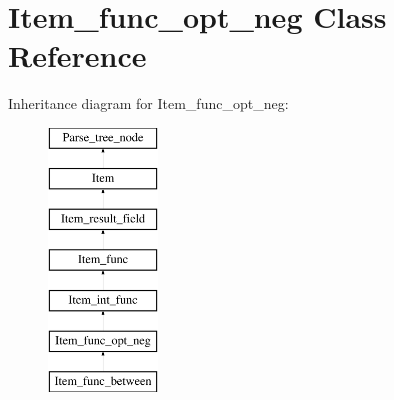 \hypertarget{classItem__func__opt__neg}{}\section{Item\+\_\+func\+\_\+opt\+\_\+neg Class Reference}
\label{classItem__func__opt__neg}
Inheritance diagram for Item\+\_\+func\+\_\+opt\+\_\+neg\+:\begin{figure}[H]
\begin{center}
\leavevmode
\includegraphics[height=7.000000cm]{classItem__func__opt__neg}
\end{center}
\end{figure}
